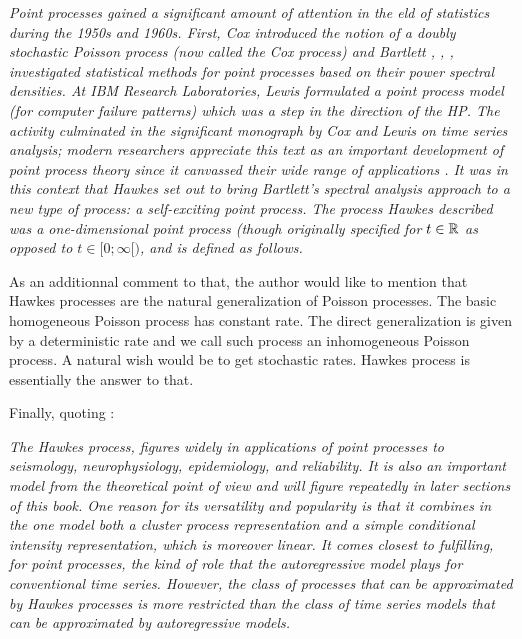 \textit{Point processes gained a significant amount of attention in the eld of statistics during the 1950s and 1960s. First, Cox \cite{hphistorique1} introduced the notion of a doubly stochastic Poisson process (now called the Cox process) and Bartlett \cite{hphistorique2}, \cite{hphistorique3}, \cite{hphistorique4}, investigated statistical methods for point processes based on their power spectral densities. At IBM Research Laboratories, Lewis \cite{hphistorique5} formulated a point process model (for computer failure patterns) which was a step in the direction of the HP. The activity culminated in the significant monograph by Cox and Lewis \cite{hphistorique6} on time series analysis; modern researchers appreciate this text as an important development of point process theory since it canvassed their wide range of applications \cite{Hawkes}. It was in this context that Hawkes \cite{Hawkes} set out to bring Bartlett's spectral analysis approach to a new type of process: a self-exciting point process. The process Hawkes described was a one-dimensional point process (though originally specified for $t \in \mathbb{R}$ as opposed to $t \in [0;\infty[)$, and is defined as follows.}

As an additionnal comment to that, the author would like to mention that Hawkes processes are the natural generalization of Poisson processes. The basic homogeneous Poisson process has constant rate. The direct generalization is given by a deterministic rate and we call such process an inhomogeneous Poisson process. A natural wish would be to get stochastic rates. Hawkes process is essentially the answer to that.

Finally, quoting \cite{daley}:

\textit{The Hawkes process, figures widely in applications of point processes to seismology, neurophysiology, epidemiology, and reliability. It is also an important model from the theoretical point of view and will figure repeatedly in later sections of this book. One reason for its versatility and popularity is that it combines in the one model both a cluster process representation and a simple conditional intensity representation, which is moreover linear. It comes closest to fulfilling, for point processes, the kind of role that the autoregressive model plays for conventional time series. However, the class of processes that can be approximated by Hawkes processes is more restricted than the class of time series models that can be approximated by autoregressive models. }






